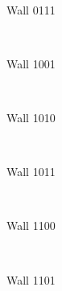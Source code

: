 \documentclass[11pt,a4paper,notitlepage]{report}
\newenvironment{img}{
	\begin{center}
		\begin{figure}[H]
			\begin{center}
			
}{
	\end{center}
		\end{figure}
			\end{center}
}
\begin{document}
				\begin{img}
					\\
					\caption{Wall 0111}
				\end{img}
				\begin{img}
					\\
					\caption{Wall 1001}
				\end{img}
				\begin{img}
					\\
					\caption{Wall 1010}
				\end{img}
				\begin{img}
					\\
					\caption{Wall 1011}
				\end{img}
				\begin{img}
					\\
					\caption{Wall 1100}
				\end{img}
				\begin{img}
					\\
					\caption{Wall 1101}
				\end{img}
\end{document}
